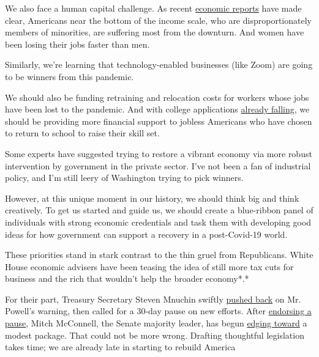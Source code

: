 We also face a human capital challenge. As recent
\href{https://www.nytimes3xbfgragh.onion/aponline/2020/05/08/business/bc-us-economy-jobs-report-inequality.html}{economic
reports} have made clear, Americans near the bottom of the income scale,
who are disproportionately members of minorities, are suffering most
from the downturn. And women have been losing their jobs faster than
men.

Similarly, we're learning that technology-enabled businesses (like Zoom)
are going to be winners from this pandemic.

We should also be funding retraining and relocation costs for workers
whose jobs have been lost to the pandemic. And with college applications
\href{https://www.wsj.com/articles/fewer-students-apply-for-college-financial-aid-a-sign-coronavirus-may-disrupt-enrollment-11589284806}{already
falling}, we should be providing more financial support to jobless
Americans who have chosen to return to school to raise their skill set.

Some experts have suggested trying to restore a vibrant economy via more
robust intervention by government in the private sector. I've not been a
fan of industrial policy, and I'm still leery of Washington trying to
pick winners.

However, at this unique moment in our history, we should think big and
think creatively. To get us started and guide us, we should create a
blue-ribbon panel of individuals with strong economic credentials and
task them with developing good ideas for how government can support a
recovery in a post-Covid-19 world.

These priorities stand in stark contrast to the thin gruel from
Republicans. White House economic advisers have been teasing the idea of
still more tax cuts for business and the rich that wouldn't help the
broader economy*.*

For their part, Treasury Secretary Steven Mnuchin swiftly
\href{https://www.bloomberg.com/news/articles/2020-05-14/mnuchin-seeks-to-assuage-investors-after-powell-s-gloomy-outlook?sref=qN0DZypA}{pushed
back} on Mr. Powell's warning, then called for a 30-day pause on new
efforts. After
\href{https://www.politico.com/news/2020/05/20/mcconnell-unemployment-benefits-271661}{endorsing
a pause}, Mitch McConnell, the Senate majority leader, has begun
\href{https://www.politico.com/newsletters/morning-money/2020/05/27/mcconnell-says-another-relief-package-is-coming-787905}{edging
toward} a modest package. That could not be more wrong. Drafting
thoughtful legislation takes time; we are already late in starting to
rebuild America

